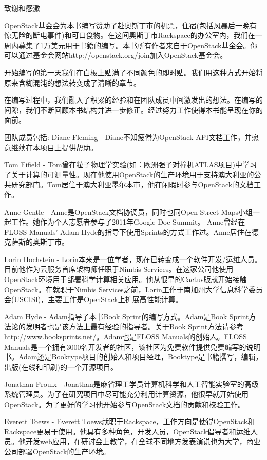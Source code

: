\documentclass[letterpaper,10pt,english]{sphinxmanual}
\begin{document}
致谢和感激

OpenStack基金会为本书编写赞助了赴奥斯丁市的机票，住宿(包括风暴后一晚有惊无险的断电事件)和可口食物。在这间奥斯丁市Rackspace的办公室内，我们在一周内募集了1万美元用于书籍的编写。本书所有作者来自于OpenStack基金会。你可以通过基金会网站http://openstack.org/join加入OpenStack基金会。

开始编写的第一天我们在白板上贴满了不同颜色的即时贴。我们用这种方式开始将原来含糊混沌的想法转变成了清晰的章节。

在编写过程中，我们融入了积累的经验和在团队成员中间激发出的想法。在编写的间隙，我们不断回顾本书结构并进一步修正。经过努力工作使得本书能呈现在你的面前。

团队成员包括: Diane Fleming - Diane不知疲倦为OpenStack API文档工作，并愿意继续在本项目上提供帮助。

Tom Fifield - Tom曾在粒子物理学实验(如：欧洲强子对撞机ATLAS项目)中学习了关于计算的可测量性。现在他使用OpenStack的生产环境用于支持澳大利亚的公共研究部门。Tom居住于澳大利亚墨尔本市，他在闲暇时参与OpenStack的文档工作。

Anne Gentle - Anne是OpenStack文档协调员，同时也同Open Street Maps小组一起工作。她作为个人志愿者参与了2011年Google Doc Summit。 Anne曾经在FLOSS Manuals’ Adam Hyde的指导下使用Sprints的方式工作过。Anne居住在德克萨斯的奥斯丁市。

Lorin Hochstein - Lorin本来是一位学者，现在已转变成一个软件开发/运维人员。目前他作为云服务首席架构师任职于Nimbis Services。在这家公司他使用OpenStack环境用于部署科学计算相关应用。他从很早的Cactus版就开始接触OpenStack。在就职于Nimbis Services之前，Lorin工作于南加州大学信息科学委员会(USCISI)，主要工作是OpenStack上扩展高性能计算。

Adam Hyde - Adam指导了本书Book Sprint的编写方式。Adam是Book Sprint方法论的发明者也是该方法上最有经验的指导者。关于Book Sprint方法请参考http://www.booksprints.net/。Adam也是FLOSS Manuals的创始人。FLOSS Manuals是一个拥有3000名开发者的社区，该社区为免费软件提供免费编写的说明书。Adam还是Booktype项目的创始人和项目经理，Booktype是书籍撰写，编辑，出版(在线和印刷)的一个开源项目。

Jonathan Proulx - Jonathan是麻省理工学员计算机科学和人工智能实验室的高级系统管理员。为了在研究项目中尽可能充分利用计算资源，他很早就开始使用OpenStack。为了更好的学习他开始参与OpenStack文档的贡献和校验工作。

Everett Toews - Everett Toews就职于Rackspace，工作方向是使得OpenStack和Rackspace更易于使用。他具有多种角色，开发人员，OpenStack倡导者和运维人员。他开发web应用，在研讨会上教学，在全球不同地方发表演说也为大学，商业公司部署OpenStack的生产环境。
\end{document}
